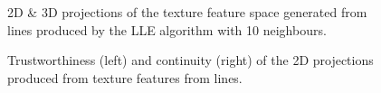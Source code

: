 \begin{figure}[H]
	\centering
	\caption{2D \& 3D projections of the texture feature space generated from lines produced by the LLE algorithm with 10 neighbours.}\label{fig:texture_LLE_mapping_lines}
\end{figure}
\clearpage


\clearpage
\begin{figure}[H]
	\centering
	\caption{Trustworthiness (left) and continuity (right) of the 2D projections produced from texture features from lines.}\label{fig:TC_2d_texture}
\end{figure}

